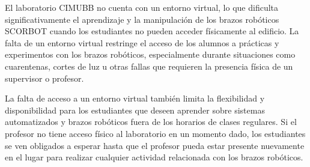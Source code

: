El laboratorio CIMUBB no cuenta con un entorno virtual, lo que dificulta significativamente el aprendizaje y la manipulación de los brazos robóticos SCORBOT cuando los estudiantes no pueden acceder físicamente al edificio. La falta de un entorno virtual restringe el acceso de los alumnos a prácticas y experimentos con los brazos robóticos, especialmente durante situaciones como cuarentenas, cortes de luz u otras fallas que requieren la presencia física de un supervisor o profesor.

La falta de acceso a un entorno virtual también limita la flexibilidad y disponibilidad para los estudiantes que deseen aprender sobre sistemas automatizados y brazos robóticos fuera de los horarios de clases regulares. Si el profesor no tiene acceso físico al laboratorio en un momento dado, los estudiantes se ven obligados a esperar hasta que el profesor pueda estar presente nuevamente en el lugar para realizar cualquier actividad relacionada con los brazos robóticos.
